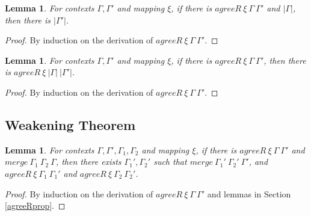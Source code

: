 \documentclass{article}
\newtheorem{lemma}[theorem]{Lemma}
\theoremstyle{definition}
\newcommand{\pure}[1]{|#1|}
\newcommand{\mrg}[3]{merge\ {#1}\ {#2}\ {#3}}
\begin{document}
\begin{lemma}\label{agreerenpure}
  For contexts $\Gamma, \Gamma'$ and mapping $\xi$, if there is $agreeR\ \xi\ \Gamma\ \Gamma'$ and $\pure{\Gamma}$, then there is $\pure{\Gamma'}$.
\end{lemma}
\begin{proof}
  By induction on the derivation of $agreeR\ \xi\ \Gamma\ \Gamma'$.
\end{proof}

\begin{lemma}\label{agreerenrere}
  For contexts $\Gamma, \Gamma'$ and mapping $\xi$, if there is $agreeR\ \xi\ \Gamma\ \Gamma'$, then there is $agreeR\ \xi\ \pure{\Gamma}\ \pure{\Gamma'}$.
\end{lemma}
\begin{proof}
  By induction on the derivation of $agreeR\ \xi\ \Gamma\ \Gamma'$.
\end{proof}

\subsection{Weakening Theorem}

\begin{lemma}\label{mergeagreereninv}
  For contexts $\Gamma, \Gamma', \Gamma_1, \Gamma_2$ and mapping $\xi$, if there is $agreeR\ \xi\ \Gamma\ \Gamma'$ and $\mrg{\Gamma_1}{\Gamma_2}{\Gamma}$, then there exists $\Gamma_1', \Gamma_2'$ such that $\mrg{\Gamma_1'}{\Gamma_2'}{\Gamma'}$, and $agreeR\ \xi\ \Gamma_1\ \Gamma_1'$ and $agreeR\ \xi\ \Gamma_2\ \Gamma_2'$.
\end{lemma}
\begin{proof}
  By induction on the derivation of $agreeR\ \xi\ \Gamma\ \Gamma'$ and lemmas in Section \ref{agreeRprop}.
\end{proof}
\end{document}

